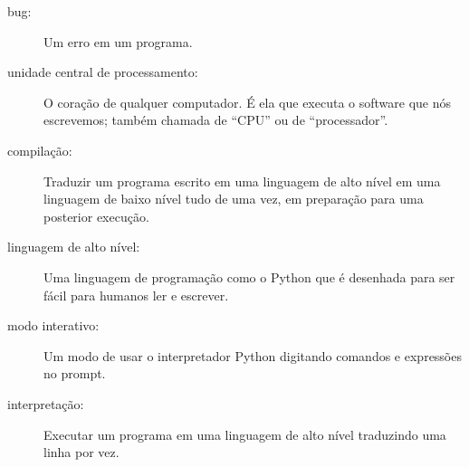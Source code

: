 \begin{description}
%

\item[bug:]  Um erro em um programa.
%

\item[unidade central de processamento:] O coração de qualquer computador.  É ela
que executa o software que nós escrevemos; também chamada de ``CPU'' ou de ``processador''.
%

\item[compilação:]  Traduzir um programa escrito em uma linguagem de alto nível
em uma linguagem de baixo nível tudo de uma vez, em preparação para uma posterior
execução.
%

\item[linguagem de alto nível:]  Uma linguagem de programação como o Python
que é desenhada para ser fácil para humanos ler e escrever.
%

\item[modo interativo:] Um modo de usar o interpretador Python
digitando comandos e expressões no prompt.
%

\item[interpretação:]  Executar um programa em uma linguagem de alto nível
traduzindo uma linha por vez.
%


\end{description}
